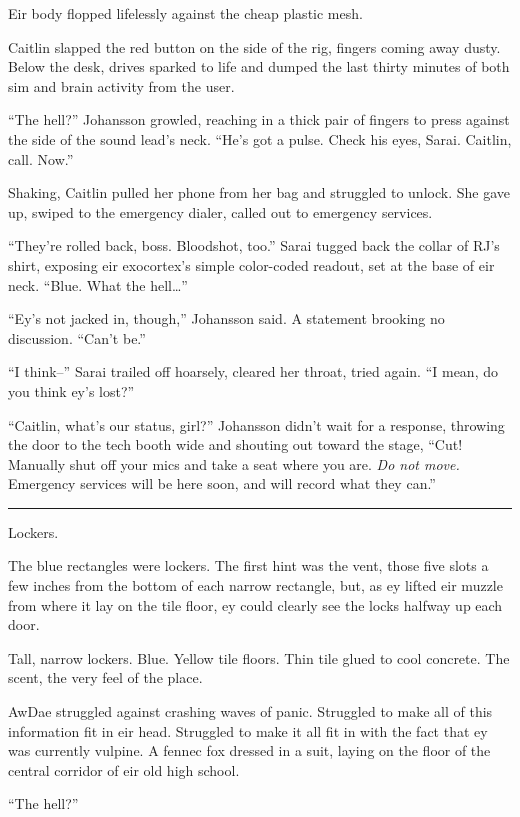 Eir body flopped lifelessly against the cheap plastic mesh.

Caitlin slapped the red button on the side of the rig, fingers coming away dusty. Below the desk, drives sparked to life and dumped the last thirty minutes of both sim and brain activity from the user.

``The hell?'' Johansson growled, reaching in a thick pair of fingers to press against the side of the sound lead's neck. ``He's got a pulse. Check his eyes, Sarai. Caitlin, call. Now.''

Shaking, Caitlin pulled her phone from her bag and struggled to unlock. She gave up, swiped to the emergency dialer, called out to emergency services.

``They're rolled back, boss. Bloodshot, too.'' Sarai tugged back the collar of RJ's shirt, exposing eir exocortex's simple color-coded readout, set at the base of eir neck. ``Blue. What the hell\ldots{}''

``Ey's not jacked in, though,'' Johansson said. A statement brooking no discussion. ``Can't be.''

``I think--'' Sarai trailed off hoarsely, cleared her throat, tried again. ``I mean, do you think ey's lost?''

``Caitlin, what's our status, girl?'' Johansson didn't wait for a response, throwing the door to the tech booth wide and shouting out toward the stage, ``Cut! Manually shut off your mics and take a seat where you are. \emph{Do not move.} Emergency services will be here soon, and will record what they can.''

\begin{center}\rule{0.5\linewidth}{0.5pt}\end{center}

Lockers.

The blue rectangles were lockers. The first hint was the vent, those five slots a few inches from the bottom of each narrow rectangle, but, as ey lifted eir muzzle from where it lay on the tile floor, ey could clearly see the locks halfway up each door.

Tall, narrow lockers. Blue. Yellow tile floors. Thin tile glued to cool concrete. The scent, the very feel of the place.

AwDae struggled against crashing waves of panic. Struggled to make all of this information fit in eir head. Struggled to make it all fit in with the fact that ey was currently vulpine. A fennec fox dressed in a suit, laying on the floor of the central corridor of eir old high school.

``The hell?''
